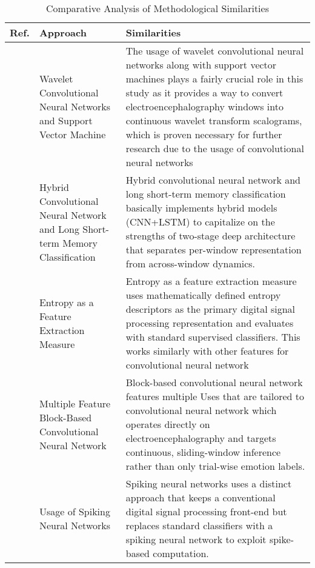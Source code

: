 \documentclass[conference]{IEEEtran}
\begin{document}
\begin{table}[htbp]
\centering
\scriptsize
\caption{Comparative Analysis of Methodological Similarities}
\label{tab:method_similarities}
\renewcommand{\arraystretch}{2}
\begin{tabular}{p{1.5cm}p{2.5cm}p{4cm}}
\hline
\textbf{Ref.} & \textbf{Approach} & \textbf{Similarities} \\
\hline
\textbf{\cite{Bagherzadeh2023HybridEEGWaveletCNN_SVM}}
& Wavelet Convolutional Neural Networks and Support Vector Machine
& The usage of wavelet convolutional neural networks along with support vector machines plays a fairly crucial role in this study as it provides a way to convert electroencephalography windows into continuous wavelet transform scalograms, which is proven necessary for further research due to the usage of convolutional neural networks \\[1mm]
\textbf{\cite{Chakravarthi2022EEGHybridCNNLSTM}}
& Hybrid Convolutional Neural Network and Long Short-term Memory Classification
& Hybrid convolutional neural network and long short-term memory classification basically implements hybrid models (CNN+LSTM) to capitalize on the strengths of two-stage deep architecture that separates per-window representation from across-window dynamics. \\[1mm]
\textbf{\cite{Patel2021EEGEntropyReview}}
& Entropy as a Feature Extraction Measure
& Entropy as a feature extraction measure uses mathematically defined entropy descriptors as the primary digital signal processing representation and evaluates with standard supervised classifiers. This works similarly with other features for convolutional neural network\\[1mm]
\textbf{\cite{Lee2020MFB_CNN_PilotMentalStates}}
& Multiple Feature Block-Based Convolutional Neural Network
& Block-based convolutional neural network features multiple Uses that are tailored to convolutional neural network which operates directly on electroencephalography and targets continuous, sliding-window inference rather than only trial-wise emotion labels. \\[1mm]
\textbf{\cite{Luo2020SNN_EEGEmotion}}
& Usage of Spiking Neural Networks
& Spiking neural networks uses a distinct approach that keeps a conventional digital signal processing front-end but replaces standard classifiers with a spiking neural network to exploit spike-based computation. \\[1mm]
\hline
\end{tabular}
\end{table}
\end{document}
